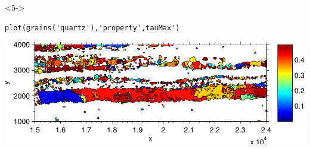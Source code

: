 \documentclass[comptress]{beamer}
\begin{document}
\begin{frame}[fragile]
\begin{overlayarea}{\textwidth}{\textheight}
    \begin{onlyenv}<5->
      \vspace{-0.3cm}
\begin{lstlisting}[style=input]
plot(grains('quartz'),'property',tauMax')
\end{lstlisting}
      \centerline{
      \includegraphics[width=\textwidth]{pic/tau}}
    \end{onlyenv}

  \end{overlayarea}






\end{frame}


\end{document}
